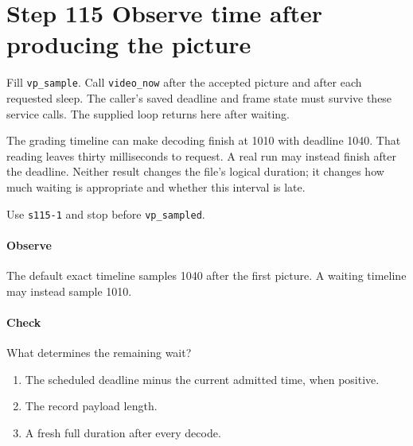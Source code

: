\section{Step 115 Observe time after producing the picture}
Fill \texttt{vp\_sample}. Call \texttt{video\_now} after the accepted picture and after each requested sleep. The caller's saved deadline and frame state must survive these service calls. The supplied loop returns here after waiting.

The grading timeline can make decoding finish at 1010 with deadline 1040. That reading leaves thirty milliseconds to request. A real run may instead finish after the deadline. Neither result changes the file's logical duration; it changes how much waiting is appropriate and whether this interval is late.

Use \texttt{s115-1} and stop before \texttt{vp\_sampled}.

\paragraph{Observe} The default exact timeline samples 1040 after the first picture. A waiting timeline may instead sample 1010.

\paragraph{Check} What determines the remaining wait?
\begin{enumerate}[label=\Alph*.]
  \item The scheduled deadline minus the current admitted time, when positive.
  \item The record payload length.
  \item A fresh full duration after every decode.
\end{enumerate}
